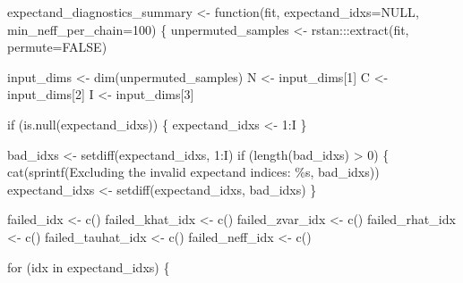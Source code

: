 \documentclass[
  letterpaper,
  DIV=11,
  numbers=noendperiod]{scrartcl}
\newenvironment{Shaded}{\begin{snugshade}}{\end{snugshade}}
\newcommand{\AttributeTok}[1]{\textcolor[rgb]{0.40,0.45,0.13}{#1}}
\newcommand{\ConstantTok}[1]{\textcolor[rgb]{0.56,0.35,0.01}{#1}}
\newcommand{\ControlFlowTok}[1]{\textcolor[rgb]{0.00,0.23,0.31}{#1}}
\newcommand{\DecValTok}[1]{\textcolor[rgb]{0.68,0.00,0.00}{#1}}
\newcommand{\FunctionTok}[1]{\textcolor[rgb]{0.28,0.35,0.67}{#1}}
\newcommand{\NormalTok}[1]{\textcolor[rgb]{0.00,0.23,0.31}{#1}}
\newcommand{\OtherTok}[1]{\textcolor[rgb]{0.00,0.23,0.31}{#1}}
\newcommand{\SpecialCharTok}[1]{\textcolor[rgb]{0.37,0.37,0.37}{#1}}
\newcommand{\StringTok}[1]{\textcolor[rgb]{0.13,0.47,0.30}{#1}}
\begin{document}
\begin{Shaded}
\begin{Highlighting}[]
\NormalTok{expectand\_diagnostics\_summary }\OtherTok{\textless{}{-}} \ControlFlowTok{function}\NormalTok{(fit,}
                                          \AttributeTok{expectand\_idxs=}\ConstantTok{NULL}\NormalTok{,}
                                          \AttributeTok{min\_neff\_per\_chain=}\DecValTok{100}\NormalTok{) \{}
\NormalTok{  unpermuted\_samples }\OtherTok{\textless{}{-}}\NormalTok{ rstan}\SpecialCharTok{:::}\FunctionTok{extract}\NormalTok{(fit, }\AttributeTok{permute=}\ConstantTok{FALSE}\NormalTok{)}

\NormalTok{  input\_dims }\OtherTok{\textless{}{-}} \FunctionTok{dim}\NormalTok{(unpermuted\_samples)}
\NormalTok{  N }\OtherTok{\textless{}{-}}\NormalTok{ input\_dims[}\DecValTok{1}\NormalTok{]}
\NormalTok{  C }\OtherTok{\textless{}{-}}\NormalTok{ input\_dims[}\DecValTok{2}\NormalTok{]}
\NormalTok{  I }\OtherTok{\textless{}{-}}\NormalTok{ input\_dims[}\DecValTok{3}\NormalTok{]}

  \ControlFlowTok{if}\NormalTok{ (}\FunctionTok{is.null}\NormalTok{(expectand\_idxs)) \{}
\NormalTok{    expectand\_idxs }\OtherTok{\textless{}{-}} \DecValTok{1}\SpecialCharTok{:}\NormalTok{I}
\NormalTok{  \}}

\NormalTok{  bad\_idxs }\OtherTok{\textless{}{-}} \FunctionTok{setdiff}\NormalTok{(expectand\_idxs, }\DecValTok{1}\SpecialCharTok{:}\NormalTok{I)}
  \ControlFlowTok{if}\NormalTok{ (}\FunctionTok{length}\NormalTok{(bad\_idxs) }\SpecialCharTok{\textgreater{}} \DecValTok{0}\NormalTok{) \{}
    \FunctionTok{cat}\NormalTok{(}\FunctionTok{sprintf}\NormalTok{(}\StringTok{\textquotesingle{}Excluding the invalid expectand indices: \%s\textquotesingle{}}\NormalTok{,}
\NormalTok{                bad\_idxs))}
\NormalTok{    expectand\_idxs }\OtherTok{\textless{}{-}} \FunctionTok{setdiff}\NormalTok{(expectand\_idxs, bad\_idxs)}
\NormalTok{  \}}

\NormalTok{  failed\_idx }\OtherTok{\textless{}{-}} \FunctionTok{c}\NormalTok{()}
\NormalTok{  failed\_khat\_idx }\OtherTok{\textless{}{-}} \FunctionTok{c}\NormalTok{()}
\NormalTok{  failed\_zvar\_idx }\OtherTok{\textless{}{-}} \FunctionTok{c}\NormalTok{()}
\NormalTok{  failed\_rhat\_idx }\OtherTok{\textless{}{-}} \FunctionTok{c}\NormalTok{()}
\NormalTok{  failed\_tauhat\_idx }\OtherTok{\textless{}{-}} \FunctionTok{c}\NormalTok{()}
\NormalTok{  failed\_neff\_idx }\OtherTok{\textless{}{-}} \FunctionTok{c}\NormalTok{()}

  \ControlFlowTok{for}\NormalTok{ (idx }\ControlFlowTok{in}\NormalTok{ expectand\_idxs) \{}


\end{Highlighting}
\end{Shaded}
\end{document}
